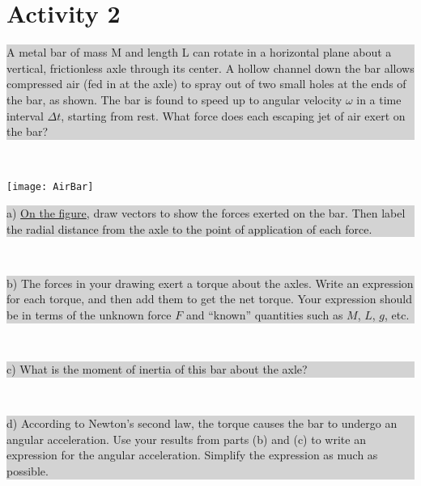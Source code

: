 \documentclass[]{article}
\newcommand{\excerpt}[1]{\colorbox{lightgray}{\parbox{14.8cm}{#1}} \\}
\begin{document}
\section*{Activity 2}%
\excerpt{
A metal bar of mass M and length L can rotate in a horizontal
plane about a vertical, frictionless axle through its center.
A hollow channel down the bar allows compressed air (fed
in at the axle) to spray out of two small holes at the ends of
the bar, as shown. The bar is found to speed up to angular
velocity $ \omega $ in a time interval $ \Delta t $, starting from rest. What
force does each escaping jet of air exert on the bar?
}
\begin{center}
	\texttt{[image: AirBar]}
\end{center}
\excerpt{
a) \underline{On the figure}, draw vectors to show the forces exerted on
the bar. Then label the radial distance from the axle to the point of application of each force.
}
\excerpt{
b) The forces in your drawing exert a torque about the axles.
Write an expression for each torque, and then add them to get
the net torque. Your expression should be in terms of the unknown force $ F $ and ``known'' quantities
such as $ M $, $ L $, $ g $, etc.
}
\excerpt{
c) What is the moment of inertia of this bar about the axle?
}
\excerpt{
d) According to Newton's second law, the torque causes the bar to undergo an angular acceleration.
Use your results from parts (b) and (c) to write an expression for the angular acceleration. Simplify the
expression as much as possible.
}
\end{document}

